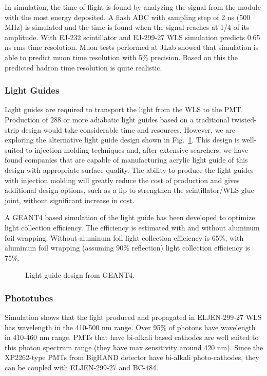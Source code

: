 \documentclass[11pt]{article}
\begin{document}
{In simulation, the time of flight is found by analyzing the signal from the module with the most energy deposited.  A flash ADC with sampling step of 2 ns (500 MHz) is simulated and the time is found when 
the signal reaches at 1/4 of its amplitude.  With EJ-232 scintillator and EJ-299-27 WLS simulation predicts 0.65 ns rms time resolution. 
Muon tests performed at JLab showed that simulation is able to predict muon time resolution 
with 5\% precision. Based on this the predicted hadron time resolution is quite realistic.

\subsubsection{Light Guides}
Light guides are required to transport the light from the WLS to the PMT.   Production of 288 or more adiabatic
light guides based on a traditional twisted-strip design would take considerable time and resources.
However, we are exploring the alternative light guide design shown in Fig.~\ref{fig:LGUIDE}.  This design is well-suited
to injection molding techniques and, 
after extensive searchers, we have found companies that are capable of manufacturing acrylic light guide of this design with appropriate surface quality.   The ability to produce the light guides with injection molding will greatly reduce the cost of production and gives additional design options, such as a lip to strengthen the scintillator/WLS glue joint, without significant increase
in cost.

A GEANT4 based simulation of the light guide has been developed to optimize light collection efficiency. 
The efficiency is estimated with and without aluminum foil wrapping. Without aluminum foil
light collection efficiency is 65\%, with aluminum foil wrapping (assuming 90\% reflection) 
light collection efficiency is 75\%. 


\begin{figure}[ht]
\centerline{
}
\caption{ Light guide design from GEANT4. }
\label{fig:LGUIDE}
\end{figure}


\subsubsection{Phototubes}
\label{sec:PMT}

Simulation shows that the light produced and propagated in ELJEN-299-27 WLS has wavelength in the 410-500 nm range. 
Over 95\% of photons have wavelength in 410-460 nm range. PMTs that have bi-alkali based cathodes are well suited 
to this photon spectrum range (they have max sensitivity around 420 nm). 
Since the XP2262-type PMTs from BigHAND detector have bi-alkali photo-cathodes, they can be coupled with ELJEN-299-27 
and BC-484.

}
\end{document}
